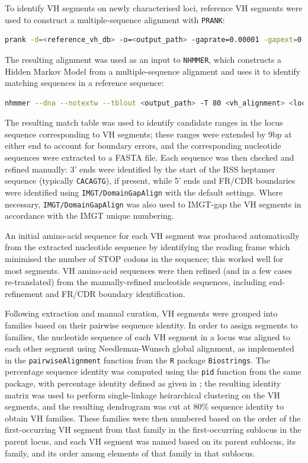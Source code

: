 To identify VH segments on newly characterised loci, reference VH segments were used to construct a multiple-sequence alignment with \texttt{PRANK}:

\begin{lstlisting}[language=bash]
prank -d=<reference_vh_db> -o=<output_path> -gaprate=0.00001 -gapext=0.00001 -F -termgap
\end{lstlisting}

The resulting alignment was used as an input to \texttt{NHMMER}, which constructs a Hidden Markov Model from a multiple-sequence alignment and uses it to identify matching sequences in a reference sequence:

\begin{lstlisting}[language=bash]
nhmmer --dna --notextw --tblout <output_path> -T 80 <vh_alignment> <locus_sequence_path>
\end{lstlisting}

The resulting match table was used to identify candidate ranges in the locus sequence corresponding to VH segments; these ranges were extended by 9bp at either end to account for boundary errors, and the corresponding nucleotide sequences were extracted to a FASTA file. Each sequence was then checked and refined manually: 3' ends were identified by the start of the RSS heptamer sequence (typically \texttt{CACAGTG}), if present, while 5' ends and FR/CDR boundaries were identified using \texttt{IMGT/DomainGapAlign} with the default settings. Where necessary, \texttt{IMGT/DomainGapAlign} was also used to IMGT-gap the VH segments in accordance with the IMGT unique numbering.

An initial amino-acid sequence for each VH segment was produced automatically from the extracted nucleotide sequence by identifying the reading frame which minimised the number of STOP codons in the sequence; this worked well for most segments. VH amino-acid sequences were then refined (and in a few cases re-translated) from the manually-refined nucleotide sequences, including end-refinement and FR/CDR boundary identification.

Following extraction and manual curation, VH segments were grouped into families based on their pairwise sequence identity. In order to assign segments to families, the nucleotide sequence of each VH segment in a locus was aligned to each other segment using Needleman-Wunsch global alignment, as implemented in the \lstinline{pairwiseAlignment} function from the \texttt{R} package \texttt{Biostrings}. The percentage sequence identity was computed using the \lstinline{pid} function from the same package, with percentage identity defined as given in ; the resulting identity matrix was used to perform single-linkage heirarchical clustering on the VH segments, and the resulting dendrogram was cut at 80\% sequence identity to obtain VH families. These families were then numbered based on the order of the first-occurring VH segment from that family in the first-occurring sublocus in the parent locus, and each VH segment was named based on its parent sublocus, its family, and its order among elements of that family in that sublocus. %

